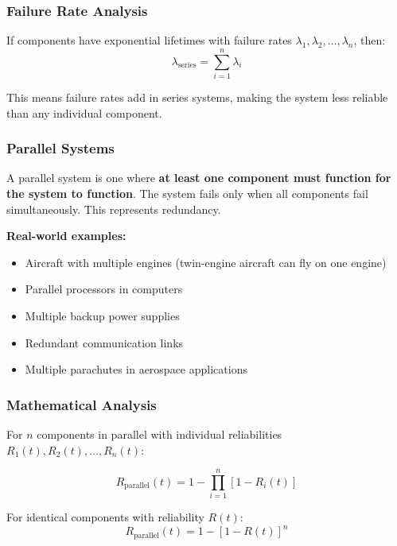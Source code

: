 \documentclass[twoside]{book}
\begin{document}
\subsubsection{Failure Rate Analysis}
If components have exponential lifetimes with failure rates $\lambda_1, \lambda_2, \ldots, \lambda_n$, then:
\begin{equation}
\lambda_{\text{series}} = \sum_{i=1}^n \lambda_i
\end{equation}

This means failure rates add in series systems, making the system less reliable than any individual component.

\subsubsection{Parallel Systems}

A parallel system is one where \textbf{at least one component must function for the system to function}. The system fails only when all components fail simultaneously. This represents redundancy.

\textbf{Real-world examples:}
\begin{itemize}
    \item Aircraft with multiple engines (twin-engine aircraft can fly on one engine)
    \item Parallel processors in computers
    \item Multiple backup power supplies
    \item Redundant communication links
    \item Multiple parachutes in aerospace applications
\end{itemize}

\subsubsection{Mathematical Analysis}

For $n$ components in parallel with individual reliabilities $R_1(t), R_2(t), \ldots, R_n(t)$:

\begin{equation}
R_{\text{parallel}}(t) = 1 - \prod_{i=1}^n [1 - R_i(t)]
\end{equation}

For identical components with reliability $R(t)$:
\begin{equation}
R_{\text{parallel}}(t) = 1 - [1 - R(t)]^n
\end{equation}
\end{document}
